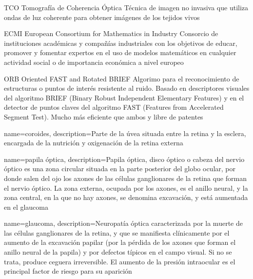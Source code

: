 
  {TCO}            %
  {Tomografía de Coherencia Óptica}  %
  {Técnica de imagen no invasiva que utiliza ondas de luz coherente
    para obtener imágenes de los tejidos vivos} %

  {ECMI}            %
  {European Consortium for Mathematics in Industry}  %
  {Consorcio de instituciones académicas y compañías industriales con
    los objetivos de educar, promover y fomentar expertos en el uso de
    modelos matemáticos en cualquier actividad social o de importancia
    económica a nivel europeo} %

  {ORB} %
  {Oriented FAST and Rotated BRIEF} %
  {Algorimo para el reconocimiento de estructuras o puntos de interés
    resistente al ruido. Basado en descriptores visuales del algoritmo
    BRIEF (Binary Robust Independent Elementary Features) y en el
    detector de puntos claves del algoritmo FAST (Features from
    Accelerated Segment Test). Mucho más eficiente que ambos y libre
    de patentes} %

{
  name={coroides},
  description={Parte de la úvea situada entre la retina y la esclera,
    encargada de la nutrición y oxigenación de la retina externa}
}

{
  name={papila óptica},
  description={Papila óptica, disco óptico o cabeza del nervio óptico
    es una zona circular situada en la parte posterior del globo
    ocular, por donde salen del ojo los axones de las células
    ganglionares de la retina que forman el nervio óptico. La zona
    externa, ocupada por los axones, es el anillo neural, y la zona
    central, en la que no hay axones, se denomina excavación, y está
    aumentada en el glaucoma}
}

{
  name={glaucoma},
  description={Neuropatía óptica caracterizada por la muerte de las
    células ganglionares de la retina, y que se manifiesta
    clínicamente por el aumento de la excavación papilar (por la
    pérdida de los axones que forman el anillo neural de la papila) y
    por defectos típicos en el campo visual. Si no se trata, produce
    ceguera irreversible. El aumento de la presión intraocular es el
    principal factor de riesgo para su aparición}
}


